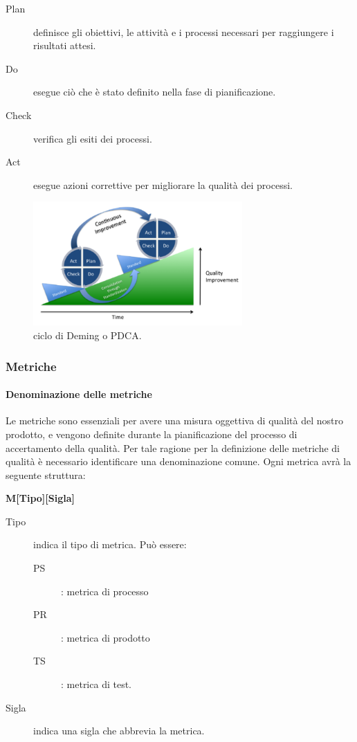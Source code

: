 \documentclass[../../norme-di-progetto.tex]{subfiles}
\begin{document}
\begin{description}
  \item [Plan] definisce gli obiettivi, le attività e i processi necessari per raggiungere i risultati attesi.
  \item [Do] esegue ciò che è stato definito nella fase di pianificazione.
  \item [Check] verifica gli esiti dei processi.
  \item [Act] esegue azioni correttive per migliorare la qualità dei processi.
\end{description}
\begin{figure}[H]
  \includegraphics[width=8cm]{PDCA-process.png}
  \centering
  \caption{ciclo di Deming o PDCA.}
\end{figure}

\subsubsection{Metriche}%
\label{subs:accertamento_della_qualita/metriche}

\paragraph{Denominazione delle metriche}%
\label{par:denominazione_delle_metriche}

Le metriche sono essenziali per avere una misura oggettiva di qualità del nostro prodotto, e vengono definite durante la pianificazione del processo di accertamento della qualità.
Per tale ragione per la definizione delle metriche di qualità è necessario identificare una denominazione comune.
Ogni metrica avrà la seguente struttura:
\begin{center}
  \textbf{M[Tipo][Sigla]}
\end{center}
\begin{description}
  \item [Tipo] indica il tipo di metrica. Può essere:
        \begin{description}
          \item[PS]: metrica di processo
          \item[PR]: metrica di prodotto
          \item[TS]: metrica di test.
        \end{description}
  \item [Sigla] indica una sigla che abbrevia la metrica.
\end{description}
\end{document}
